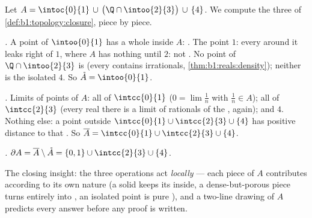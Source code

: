 \begin{example}\label{ex:b1:topology:anatomy}
Let $A = \intoc{0}{1} \,\cup\, \bigl(\Q \cap \intoo{2}{3}\bigr)
\,\cup\, \{4\}$. We compute the three  of
\cref{def:b1:topology:closure}, piece by piece.

\emph{.} A point of $\intoo{0}{1}$ has a whole 
inside $A$: . The point $1$: every  around it
leaks right of $1$, where $A$ has nothing until $2$: not
. No point of $\Q \cap \intoo{2}{3}$ is  (every
 contains irrationals, \cref{thm:b1:reals:density});
neither is the isolated $4$. So $\mathring A = \intoo{0}{1}$.

\emph{.} Limits of points of $A$: all of $\intcc{0}{1}$
($0 = \lim \frac1n$ with $\frac 1n \in A$); all of
$\intcc{2}{3}$ (every real there is a limit of rationals of the
,  again); and $4$. Nothing else: a point
outside $\intcc{0}{1} \cup \intcc{2}{3} \cup \{4\}$ has positive
distance to that . So $\overline A = \intcc{0}{1} \cup
\intcc{2}{3} \cup \{4\}$.

\emph{.} $\partial A = \overline A \setminus \mathring A
= \{0, 1\} \cup \intcc{2}{3} \cup \{4\}$.

The closing insight: the three operations act \emph{locally} ---
each piece of $A$ contributes according to its own nature (a
solid  keeps its inside, a dense-but-porous piece turns
entirely into , an isolated point is pure ), and
a two-line drawing of $A$ predicts every answer before any proof
is written.
\end{example}

